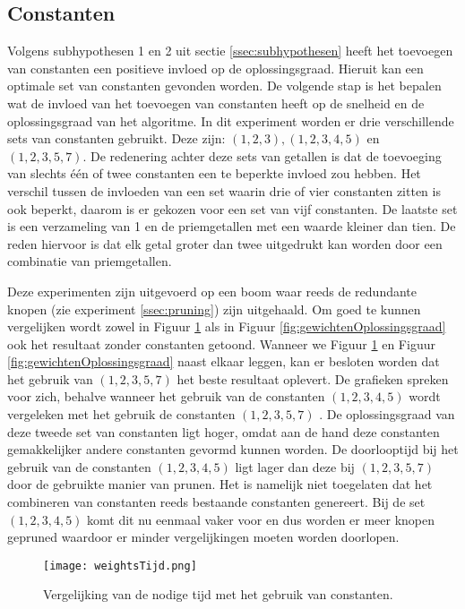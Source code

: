 \documentclass[Main.tex]{subfiles}
\begin{document}
\subsection{Constanten} \label{ssec:constanten}
Volgens subhypothesen 1 en 2 uit sectie \ref{ssec:subhypothesen} heeft het toevoegen van constanten een positieve invloed op de oplossingsgraad. Hieruit kan een optimale set van constanten gevonden worden.
De volgende stap is het bepalen wat de invloed van het toevoegen van constanten heeft op de snelheid en de oplossingsgraad van het algoritme. In dit experiment worden er drie verschillende sets van constanten gebruikt. Deze zijn: $(1,2,3), (1,2,3,4,5)$ en $(1,2,3,5,7)$. De redenering achter deze sets van getallen is dat de toevoeging van slechts \'e\'en of twee constanten een te beperkte invloed zou hebben. Het verschil tussen de invloeden van een set waarin drie of vier constanten zitten is ook beperkt, daarom is er gekozen voor een set van vijf constanten. De laatste set is een verzameling van 1 en de priemgetallen met een waarde kleiner dan tien. De reden hiervoor is dat elk getal groter dan twee uitgedrukt kan worden door een combinatie van priemgetallen.
\par Deze experimenten zijn uitgevoerd op een boom waar reeds de redundante knopen (zie experiment \ref{ssec:pruning}) zijn uitgehaald. Om goed te kunnen vergelijken wordt zowel in Figuur \ref{fig:gewichtenTijd} als in Figuur \ref{fig:gewichtenOplossingsgraad} ook het resultaat zonder constanten getoond. Wanneer we Figuur \ref{fig:gewichtenTijd} en Figuur \ref{fig:gewichtenOplossingsgraad} naast elkaar leggen, kan er besloten worden dat het gebruik van $(1,2,3,5,7)$ het beste resultaat oplevert. De grafieken spreken voor zich, behalve wanneer het gebruik van de constanten $(1, 2, 3, 4, 5)$  wordt vergeleken met het gebruik de constanten $(1, 2, 3, 5, 7)$ . De oplossingsgraad van deze tweede set van constanten ligt hoger, omdat aan de hand deze constanten gemakkelijker andere constanten gevormd kunnen worden. De doorlooptijd bij het gebruik van de constanten $(1, 2, 3, 4, 5)$ ligt lager dan deze bij $(1,2,3,5,7)$ door de gebruikte manier van prunen. Het is namelijk niet toegelaten dat het combineren van constanten reeds bestaande constanten genereert. Bij de set $(1, 2, 3, 4, 5)$ komt dit nu eenmaal vaker voor en dus worden er meer knopen gepruned waardoor er minder vergelijkingen moeten worden doorlopen.

\begin{figure}[!htb]
\centering
\texttt{[image: weightsTijd.png]} 
\caption{Vergelijking van de nodige tijd met het gebruik van constanten.} \label{fig:gewichtenTijd}
\end{figure}
\end{document}
